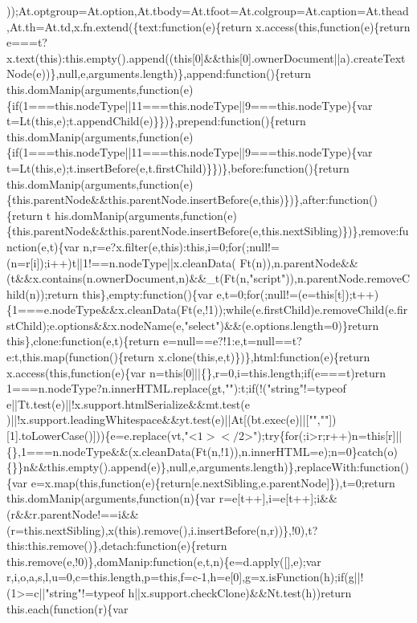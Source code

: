 \begin{DoxyCode}
{      ));At.optgroup=At.option,At.tbody=At.tfoot=At.colgroup=At.caption=At.thead,At.th=At.td,x.fn.extend(\{text:function(e)\{return x.access(this,function(e)\{return
       e===t?x.text(this):this.empty().append((this[0]&&this[0].ownerDocument||a).createTextNode(e))\},null,e,arguments.length)\},append:function()\{return
       this.domManip(arguments,function(e)\{if(1===this.nodeType||11===this.nodeType||9===this.nodeType)\{var
       t=Lt(this,e);t.appendChild(e)\}\})\},prepend:function()\{return
       this.domManip(arguments,function(e)\{if(1===this.nodeType||11===this.nodeType||9===this.nodeType)\{var t=Lt(this,e);t.insertBefore(e,t.firstChild)\}\})\},before:function()\{return
       this.domManip(arguments,function(e)\{this.parentNode&&this.parentNode.insertBefore(e,this)\})\},after:function()\{return
       t
      his.domManip(arguments,function(e)\{this.parentNode&&this.parentNode.insertBefore(e,this.nextSibling)\})\},remove:function(e,t)\{var
       n,r=e?x.filter(e,this):this,i=0;for(;null!=(n=r[i]);i++)t||1!==n.nodeType||x.cleanData(
      Ft(n)),n.parentNode&&(t&&x.contains(n.ownerDocument,n)&&\_t(Ft(n,"script")),n.parentNode.removeChild(n));return this\},empty:function()\{var
       e,t=0;for(;null!=(e=this[t]);t++)\{1===e.nodeType&&x.cleanData(Ft(e,!1));while(e.firstChild)e.removeChild(e.firstChild);e.options&&x.nodeName(e,"select")&&(e.options.length=0)\}return
       this\},clone:function(e,t)\{return e=null==e?!1:e,t=null==t?e:t,this.map(function()\{return
       x.clone(this,e,t)\})\},html:function(e)\{return x.access(this,function(e)\{var n=this[0]||\{\},r=0,i=this.length;if(e===t)return
       1===n.nodeType?n.innerHTML.replace(gt,""):t;if(!("string"!=typeof
       e||Tt.test(e)||!x.support.htmlSerialize&&mt.test(e
      )||!x.support.leadingWhitespace&&yt.test(e)||At[(bt.exec(e)||["",""])[1].toLowerCase()]))\{e=e.replace(vt,"<$
      1></$2>");try\{for(;i>r;r++)n=this[r]||\{\},1===n.nodeType&&(x.cleanData(Ft(n,!1)),n.innerHTML=e);n=0\}catch(o)\{\}\}n&&this.empty().append(e)\},null,e,arguments.length)\},replaceWith:function()\{var
       e=x.map(this,function(e)\{return[e.nextSibling,e.parentNode]\}),t=0;return this.domManip(arguments,function(n)\{var
       r=e[t++],i=e[t++];i&&
      (r&&r.parentNode!==i&&(r=this.nextSibling),x(this).remove(),i.insertBefore(n,r))\},!0),t?this:this.remove()\},detach:function(e)\{return this.remove(e,!0)\},domManip:function(e,t,n)\{e=d.apply([],e);var
       r,i,o,a,s,l,u=0,c=this.length,p=this,f=c-1,h=e[0],g=x.isFunction(h);if(g||!(1>=c||"string"!=typeof
       h||x.support.checkClone)&&Nt.test(h))return this.each(function(r)\{var
}
\end{DoxyCode}
